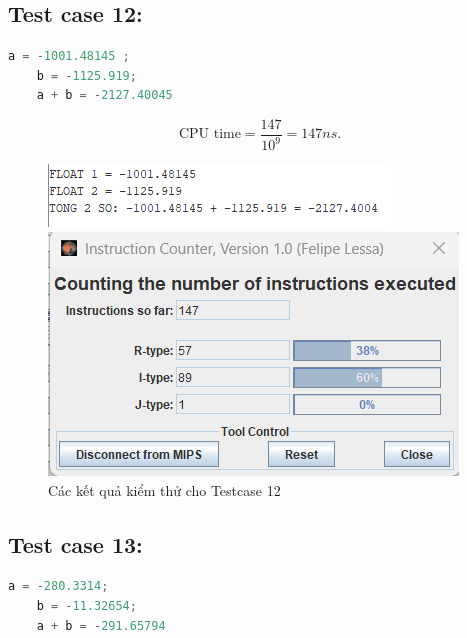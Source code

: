 \subsection{Test case 12:}
\begin{lstlisting}[language=Python]
    a = -1001.48145 ;
    b = -1125.919;
    a + b = -2127.40045
\end{lstlisting}
\[
\text{CPU time} = \frac{\text{147}}{10^9} = 147 ns.
\]
\begin{figure}[!h]
    \centering
    \begin{minipage}[b]{0.48\textwidth}
        \centering
        \includegraphics[width=\textwidth]{image/TESTCASE/Testcase 12.png}
    \end{minipage}
    \hfill
    \begin{minipage}[b]{0.48\textwidth}
        \centering
        \includegraphics[width=\textwidth]{image/TESTCASE/Instruction Counter 12.png}
    \end{minipage}
    \vspace{0.5cm}
    \caption{Các kết quả kiểm thử cho Testcase 12}
\end{figure}

\vspace{0.5cm}

\subsection{Test case 13:}
\begin{lstlisting}[language=Python]
    a = -280.3314;
    b = -11.32654;
    a + b = -291.65794
\end{lstlisting}


